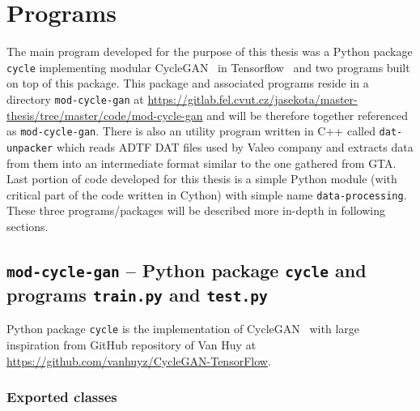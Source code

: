 \chapter{Programs} \label{programs}

The main program developed for the purpose of this thesis was a Python package \texttt{cycle} implementing modular CycleGAN~\cite{cyclegan} in Tensorflow~\cite{tensorflow} and two programs built on top of this package. This package and associated programs reside in a directory \texttt{mod-cycle-gan} at \url{https://gitlab.fel.cvut.cz/jasekota/master-thesis/tree/master/code/mod-cycle-gan} and will be therefore together referenced as \texttt{mod-cycle-gan}. There is also an utility program written in C++ called \texttt{dat-unpacker} which reads ADTF DAT files used by Valeo company and extracts data from them into an intermediate format similar to the one gathered from GTA. Last portion of code developed for this thesis is a simple Python module (with critical part of the code written in Cython) with simple name \texttt{data-processing}. These three programs/packages will be described more in-depth in following sections.

\section[\texttt{mod-cycle-gan}]{\texttt{mod-cycle-gan} -- Python package \texttt{cycle} and programs \texttt{train.py} and \texttt{test.py}}

Python package \texttt{cycle} is the implementation of CycleGAN~\cite{cyclegan} with large inspiration from GitHub repository of Van Huy at \url{https://github.com/vanhuyz/CycleGAN-TensorFlow}.

\subsection{Exported classes}


